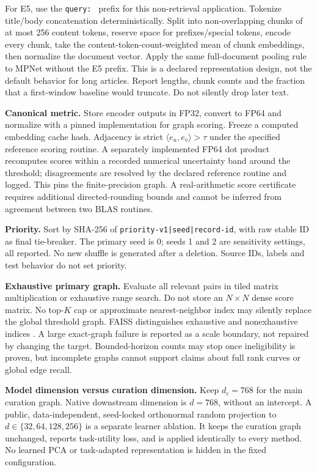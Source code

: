 \documentclass[11pt,a4paper]{article}
\begin{document}
For E5, use the \texttt{query: } prefix for this non-retrieval application. Tokenize title/body concatenation deterministically. Split into non-overlapping chunks of at most 256 content tokens, reserve space for prefixes/special tokens, encode every chunk, take the content-token-count-weighted mean of chunk embeddings, then normalize the document vector. Apply the same full-document pooling rule to MPNet without the E5 prefix. This is a declared representation design, not the default behavior for long articles. Report lengths, chunk counts and the fraction that a first-window baseline would truncate. Do not silently drop later text.

\textbf{Canonical metric.} Store encoder outputs in FP32, convert to FP64 and normalize with a pinned implementation for graph scoring. Freeze a computed embedding cache hash. Adjacency is strict $\langle e_u,e_v\rangle>\tau$ under the specified reference scoring routine. A separately implemented FP64 dot product recomputes scores within a recorded numerical uncertainty band around the threshold; disagreements are resolved by the declared reference routine and logged. This pins the finite-precision graph. A real-arithmetic score certificate requires additional directed-rounding bounds and cannot be inferred from agreement between two BLAS routines.

\textbf{Priority.} Sort by SHA-256 of \texttt{priority-v1|seed|record-id}, with raw stable ID as final tie-breaker. The primary seed is 0; seeds 1 and 2 are sensitivity settings, all reported. No new shuffle is generated after a deletion. Source IDs, labels and test behavior do not set priority.

\textbf{Exhaustive primary graph.} Evaluate all relevant pairs in tiled matrix multiplication or exhaustive range search. Do not store an $N\times N$ dense score matrix. No top-$K$ cap or approximate nearest-neighbor index may silently replace the global threshold graph. FAISS distinguishes exhaustive and nonexhaustive indices \cite{faiss}. A large exact-graph failure is reported as a scale boundary, not repaired by changing the target. Bounded-horizon counts may stop once ineligibility is proven, but incomplete graphs cannot support claims about full rank curves or global edge recall.

\textbf{Model dimension versus curation dimension.} Keep $d_c=768$ for the main curation graph. Native downstream dimension is $d=768$, without an intercept. A public, data-independent, seed-locked orthonormal random projection to $d\in\{32,64,128,256\}$ is a separate learner ablation. It keeps the curation graph unchanged, reports task-utility loss, and is applied identically to every method. No learned PCA or task-adapted representation is hidden in the fixed configuration.
\end{document}
